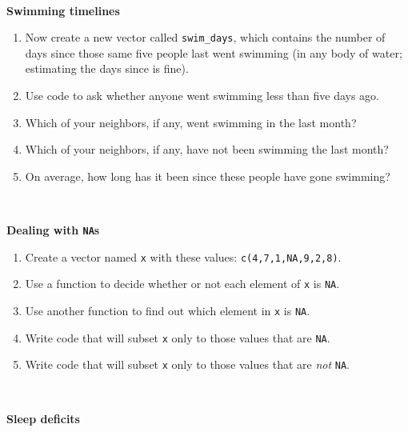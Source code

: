 \documentclass[]{book}
\begin{document}
~

\textbf{Swimming timelines}

\begin{enumerate}
\def\labelenumi{\arabic{enumi}.}
\setcounter{enumi}{18}
\item
  Now create a new vector called \texttt{swim\_days}, which contains the number of days since those same five people last went swimming (in any body of water; estimating the days since is fine).
\item
  Use code to ask whether anyone went swimming less than five days ago.
\item
  Which of your neighbors, if any, went swimming in the last month?
\item
  Which of your neighbors, if any, have not been swimming the last month?
\item
  On average, how long has it been since these people have gone swimming?
\end{enumerate}

~

\textbf{Dealing with \texttt{NA}s}

\begin{enumerate}
\def\labelenumi{\arabic{enumi}.}
\setcounter{enumi}{23}
\item
  Create a vector named \texttt{x} with these values: \texttt{c(4,7,1,NA,9,2,8)}.
\item
  Use a function to decide whether or not each element of \texttt{x} is \texttt{NA}.
\item
  Use another function to find out which element in \texttt{x} is \texttt{NA}.
\item
  Write code that will subset \texttt{x} only to those values that are \texttt{NA}.
\item
  Write code that will subset \texttt{x} only to those values that are \emph{not} \texttt{NA}.
\end{enumerate}

~

\textbf{Sleep deficits}
\end{document}

